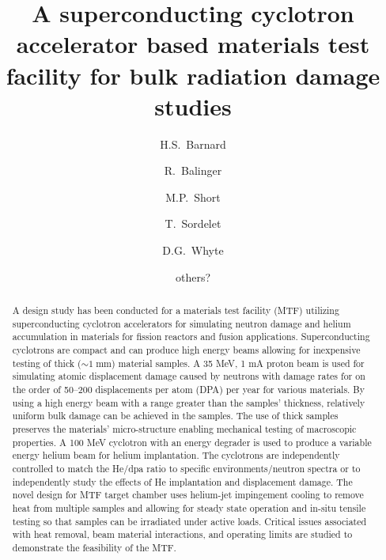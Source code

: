 \documentclass[final,3p,times,twocolumn]{elsarticle} %
\begin{document}

\begin{frontmatter}

\title{A superconducting cyclotron accelerator based materials test facility for bulk radiation damage studies}


\author{H.S.~Barnard}
\author{R.~Balinger}
\author{M.P.~Short}
\author{T.~Sordelet}
\author{D.G.~Whyte}
\author{others?}

\address{Massachusetts Institute of
  Technology, Nuclear Science and Engineering. 
  Cambridge, Massachusetts, USA}


\begin{abstract}

A design study has been conducted for a materials test facility (MTF) utilizing superconducting cyclotron accelerators for simulating neutron damage and helium accumulation in materials for fission reactors and fusion applications.  Superconducting cyclotrons are compact and can produce high energy beams allowing for inexpensive testing of thick ($\sim 1\;\mathrm{mm}$) material samples.  A 35 MeV, 1 mA proton beam is used for simulating atomic displacement damage caused by neutrons with damage rates for on the order of 50--200 displacements per atom (DPA) per year for various materials.  By using a high energy beam with a range greater than the samples' thickness, relatively uniform bulk damage can be achieved in the samples.  The use of thick samples preserves the materials' micro-structure enabling mechanical testing of macroscopic properties.  A 100 MeV cyclotron with an energy degrader is used to produce a variable energy helium beam for helium implantation.  The cyclotrons are independently controlled to match the He/dpa ratio to specific environments/neutron spectra or to independently study the effects of He implantation and displacement damage.  The novel design for MTF target chamber uses helium-jet impingement cooling to remove heat from multiple samples and allowing for steady state operation and in-situ tensile testing so that samples can be irradiated under active loads.  Critical issues associated with heat removal, beam material interactions, and operating limits are studied to demonstrate the feasibility of the MTF.

\end{abstract}


\end{frontmatter}
\end{document}
